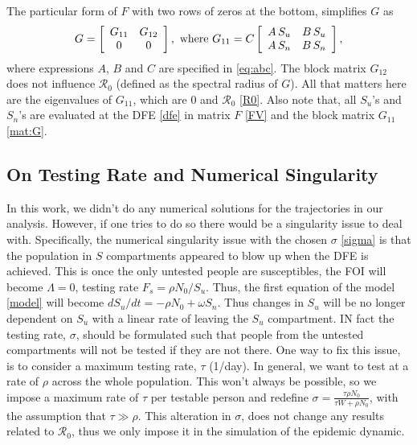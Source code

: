 \documentclass[12pt]{article}
\newcommand{\Rnum}{\mathcal{R}_0}
\theoremstyle{definition} %
\begin{document}
The particular form of $F$ with two rows of zeros at the bottom, simplifies $G$ as 
\begin{equation}
\label{mat:G}
G = \left[ \begin {array}{cc}
G_{11}&G_{12}\\
0&0
\end {array} \right], \text{ where } \\
G_{11} =C
\left[\begin {array}{cc}
A\,S_u & B\,S_u\\
A\,S_n & B\,S_n
\end {array}\right],
\end{equation}
where expressions $A$, $B$ and $C$ are specified in \eqref{eq:abc}.
The block matrix $G_{12}$ does not influence $\Rnum$ (defined as the spectral radius of $G$). All that matters here are the eigenvalues of $G_{11}$, which are 0 and $\Rnum$ \eqref{R0}.
Also note that, all $S_u$'s and $S_n$'s are evaluated at the DFE \eqref{dfe} in matrix $F$ \eqref{FV} and the block matrix $G_{11}$ \eqref{mat:G}.

\subsection{On Testing Rate and Numerical Singularity}

In this work, we didn't do any numerical solutions for the trajectories in our analysis. However, if one tries to do so there would be a singularity issue to deal with. 
Specifically, the numerical singularity issue with the chosen $\sigma$ \eqref{sigma} is that the population in $S$ compartments appeared to blow up when the DFE is achieved. This is once the only untested people are susceptibles, the FOI will become $\Lambda=0$, testing rate $F_s=\rho N_0/S_u$. Thus, the first equation of the model \eqref{model} will become
$d S_u/dt = - \rho N_0 + \omega S_n$. Thus changes in $S_u$ will be no longer dependent on $S_u$ with a linear rate of leaving the $S_u$ compartment.
IN fact the testing rate, $\sigma$, should be formulated such that people from the untested compartments will not be tested if they are not there.
One way to fix this issue, is to consider a maximum testing rate, $\tau$ (1/day). In general, we want to test at a rate of $\rho$ across the whole population. This won't always be possible, so we impose a maximum rate of $\tau$ per testable person and redefine $\sigma = \frac{\tau \rho N_0}{\tau W + \rho N_0}$, with the assumption that $\tau \gg \rho$. This alteration in $\sigma$, does not change any results related to $\Rnum$, thus we only impose it in the simulation of the epidemic dynamic.
\end{document}
